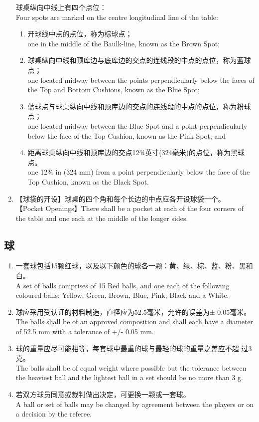 \begin{enumerate}[label=(\alph*)]
    球桌纵向中线上有四个点位：\\
    Four spots are marked on the centre longitudinal line of the table:
    \begin{enumerate}[label=(\roman*)]
        \item 开球线中点的点位，称为棕球点；\\
        one in the middle of the Baulk-line, known as the Brown Spot;
        \item 球桌纵向中线和顶库边与底库边的交点的连线段的中点的点位，称为蓝球点；\\
        one located midway between the points perpendicularly below the faces of the Top and Bottom Cushions, known as the Blue Spot;
        \item 蓝球点与球桌纵向中线和顶库边的交点的连线段的中点的点位，称为粉球点；\\
        one located midway between the Blue Spot and a point perpendicularly below the face of the Top Cushion, known as the Pink Spot; and        \item 距离球桌纵向中线和顶库边的交点12¾英寸(324毫米)的点位，称为黑球点。\\
        one 12¾ in (324 mm) from a point perpendicularly below the face of the Top Cushion, known as the Black Spot.
    \end{enumerate}
    \item【球袋的开设】球桌的四个角和每个长边的中点应各开设球袋一个。\\
    【Pocket Openings】There shall be a pocket at each of the four corners of the table and one each at the middle of the longer sides.
\end{enumerate}

\subsection{球}

\begin{enumerate}
    \item 一套球包括15颗红球，以及以下颜色的球各一颗：黄、绿、棕、蓝、粉、黑和白。\\
    A set of balls comprises of 15 Red balls, and one each of the following coloured balls: Yellow, Green, Brown, Blue, Pink, Black and a White. 
    \item 球应采用受认证的材料制造，直径应为52.5毫米，允许的误差为± 0.05毫米。\\
    The balls shall be of an approved composition and shall each have a diameter of 52.5 mm with a tolerance of +/- 0.05 mm. 
    \item 球的重量应尽可能相等，每套球中最重的球与最轻的球的重量之差应不超
    过3克。\\
    The balls shall be of equal weight where possible but the tolerance between the heaviest ball and the lightest ball in a set should be no more than 3 g.
    \item 若双方球员同意或裁判做出决定，可更换一颗或一套球。\\
    A ball or set of balls may be changed by agreement between the players or on a decision by the referee.
\end{enumerate}

